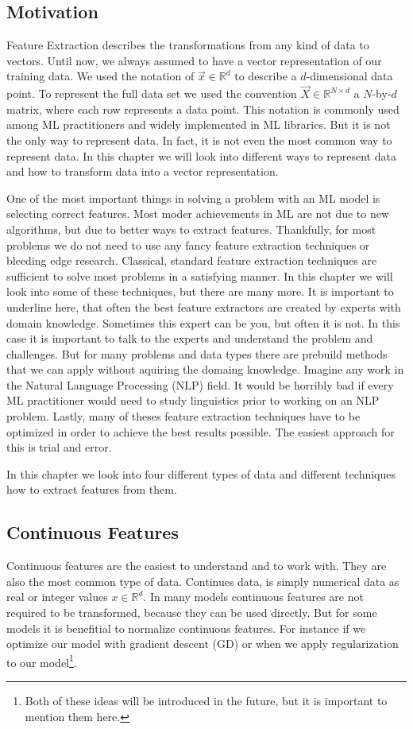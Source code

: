 \documentclass[a4paper]{article}
\begin{document}
\subsection{Motivation}
Feature Extraction describes the transformations from any kind of data to vectors.
Until now, we always assumed to have a vector representation of our training data.
We used the notation of $\vec{x} \in \mathbb{R}^d$ to describe a $d$-dimensional data point.
To represent the full data set we used the convention $\vec{X} \in \mathbb{R}^{N \times d}$ 
a $N$-by-$d$ matrix, where each row represents a data point. This notation is commonly used among ML practitioners
and widely implemented in ML libraries. But it is not the only way to represent data. In fact, it is not even the most common way to represent data.
In this chapter we will look into different ways to represent data and how to transform data into a vector representation.

One of the most important things in solving a problem with an ML model is selecting correct features.
Most moder achievements in ML are not due to new algorithms, but due to better ways to extract features.
Thankfully, for most problems we do not need to use any fancy feature extraction techniques or bleeding edge research.
Classical, standard feature extraction techniques are sufficient to solve most problems in a satisfying manner.
In this chapter we will look into some of these techniques, but there are many more.
It is important to underline here, that often the best feature extractors are created by experts with domain knowledge.
Sometimes this expert can be you, but often it is not. In this case it is important to talk to the experts and understand the problem and challenges.
But for many problems and data types there are prebuild methods that we can apply without aquiring the domaing knowledge.
Imagine any work in the Natural Language Processing (NLP) field. It would be horribly bad if every ML practitioner would need to study linguistics prior
to working on an NLP problem.
Lastly, many of theses feature extraction techniques have to be optimized in order to achieve the best results possible. The easiest approach for this is trial and error.

In this chapter we look into four different types of data and different techniques how to extract features from them.

\subsection{Continuous Features}
Continuous features are the easiest to understand and to work with. They are also the most common type of data.
Continues data, is simply numerical data as real or integer values $x \in \mathbb{R}^d$. In many models continuous features are not required
to be transformed, because they can be used directly. But for some models it is benefitial to normalize continuous features.
For instance if we optimize our model with gradient descent (GD) or when we apply regularization to our model\footnote{Both of these ideas will be introduced in the future, but it is important to mention them here.}.
\end{document}
